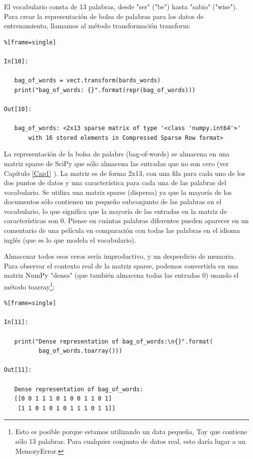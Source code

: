   El vocabulario consta de 13 palabras, desde "{}ser"{} ("{}be"{})  hasta "{}sabio"{} ("{}wise"{}). \\
  
  Para crear la representación de bolsa de palabras para los datos de entrenamiento, llamamos al método transformación   {\ttfamily transform:}  

 \begin{lstlisting}%[frame=single]

In[10]:

   bag_of_words = vect.transform(bards_words)
   print("bag_of_words: {}".format(repr(bag_of_words)))

Out[10]:

   bag_of_words: <2x13 sparse matrix of type '<class 'numpy.int64'>'
       with 16 stored elements in Compressed Sparse Row format>

\end{lstlisting}

La representación de la bolsa de palabrs (bag-of-words) se almacena en una matriz sparse de
SciPy que sólo almacena las entradas que no son cero (ver Capítulo \ref{Cap1} ). La matriz es de 
forma 2x13, con una fila para cada uno de los dos puntos de datos y una característica para
cada una de las palabras  del vocabulario.  
Se utiliza una matriz sparse (dispersa) ya que la  mayoría de los documentos sólo contienen un
 pequeño subconjunto de las palabras en el vocabulario, lo que significa que la mayoría de las  entradas en la matriz de características son 0.  Piense en cuántas palabras diferentes pueden aparecer en un comentario  de una película en comparación con todas las palabras en el idioma inglés (que es lo que modela el vocabulario).

Almacenar todos esos ceros sería improductivo, y un desperdicio de memoria. Para observar el
 contexto real de la matriz sparse, podemos convertirla en una matriz NumPy  "{}densa"{} 
(que también almacena todas las entradas 0) usando el método  {\ttfamily toarray}\footnote{Esto es posible porque estamos utilizando un data pequeña, Toy que contiene sólo 13 palabras. Para cualquier conjunto de datos real, esto daría lugar a un {\ttfamily MemoryError}.}:


\begin{lstlisting}%[frame=single]

In[11]:

   print("Dense representation of bag_of_words:\n{}".format(
          bag_of_words.toarray()))

Out[11]:

   Dense representation of bag_of_words:
   [[0 0 1 1 1 0 1 0 0 1 1 0 1]
    [1 1 0 1 0 1 0 1 1 1 0 1 1]]

\end{lstlisting}


